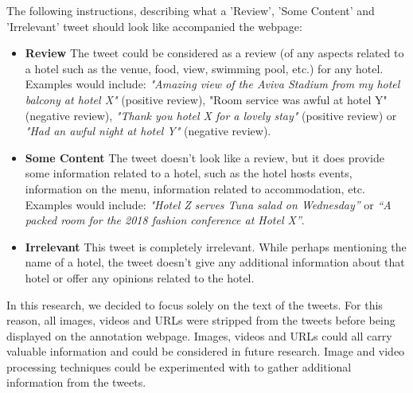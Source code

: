 The following instructions, describing what a 'Review', 'Some Content' and 'Irrelevant' tweet should look like accompanied the webpage:
\begin{itemize}
    \item \textbf{Review} \newline
    The tweet could be considered as a review (of any aspects related to a hotel such as the venue, food, view, swimming pool, etc.) for any hotel. Examples would include: \emph{"Amazing view of the Aviva Stadium from my hotel balcony at hotel X"} (positive review), "Room service was awful at hotel Y" (negative review), \emph{"Thank you hotel X for a lovely stay"} (positive review) or \emph{"Had an awful night at hotel Y"} (negative review).
    \item \textbf{Some Content} \newline
    The tweet doesn't look like a review, but it does provide some information related to a hotel, such as the hotel hosts events, information on the menu, information related to accommodation, etc. Examples would include: \emph{"Hotel Z serves Tuna salad on Wednesday”} or \emph{“A packed room for the 2018 fashion conference at Hotel X”}.
    \item \textbf{Irrelevant} \newline
    This tweet is completely irrelevant. While perhaps mentioning the name of a hotel, the tweet doesn't give any additional information about that hotel or offer any opinions related to the hotel.
\end{itemize}

In this research, we decided to focus solely on the text of the tweets. For this reason, all images, videos and URLs were stripped from the tweets before being displayed on the annotation webpage. Images, videos and URLs could all carry valuable information and could be considered in future research. Image and video processing techniques could be experimented with to gather additional information from the tweets.   

